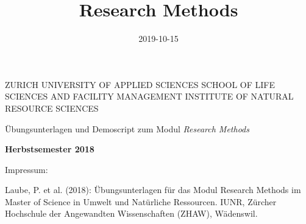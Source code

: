 \documentclass[]{book}
\title{Research Methods}
\author{}
\date{2019-10-15}
\begin{document}
\maketitle


\begin{titlepage}
\begin{center}
  
{\small 
ZURICH UNIVERSITY OF APPLIED SCIENCES
\linebreak SCHOOL OF LIFE SCIENCES AND FACILITY MANAGEMENT
\linebreak INSTITUTE OF NATURAL RESOURCE SCIENCES
}

\end{center}
\vspace{1.5cm}
\begin{center}

{\Large Übungsunterlagen und Demoscript zum Modul \emph{Research Methods}}

\end{center}
 \vspace{1cm}


\begin{center}
\textbf{Herbstsemester 2018}


\end{center} 

\vspace{1.0cm}


\newpage
\thispagestyle{empty}
\begin{minipage}{15cm}
\begin{flushleft}




\vspace{18cm}
{\large Impressum:}

\vspace{0.5cm}

Laube, P. et al. (2018): Übungsunterlagen für das Modul Research Methods im Master of Science in Umwelt und Natürliche Ressourcen. IUNR, Zürcher Hochschule der Angewandten Wissenschaften (ZHAW), W{\"a}denswil.

\end{flushleft}
\end{minipage}

\end{titlepage}
\restoregeometry
\end{document}
